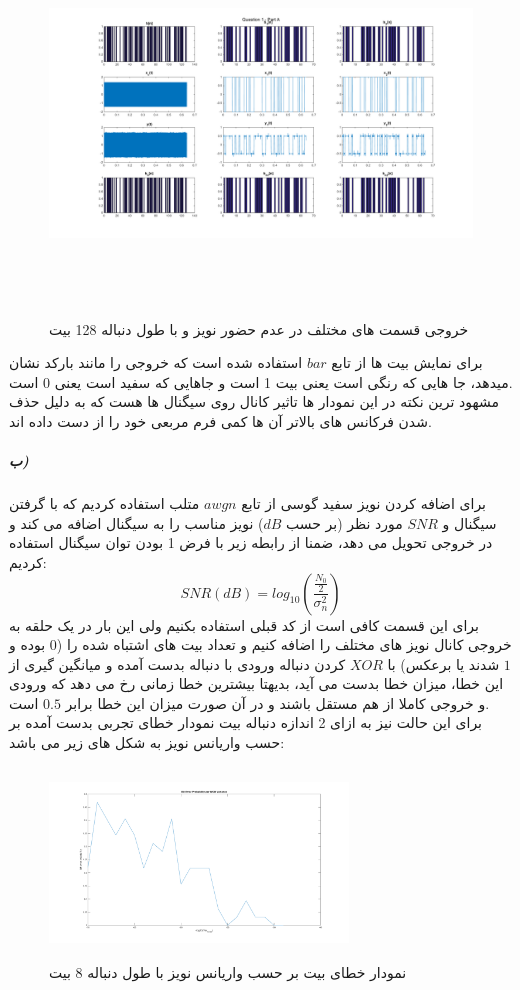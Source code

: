 \documentclass[a4paper,12pt]{article}
\begin{document}
\begin{figure}[htbp]
\centerline{\includegraphics[width=6.625in, height=4in]{../3.Transferring0and1/Q1PA_128.png}}
\caption{خروجی قسمت های مختلف در عدم حضور نویز و با طول دنباله 128 بیت}
\label{fig}
\end{figure}
برای نمایش بیت ها از تابع $bar$ استفاده شده است که خروجی را مانند بارکد نشان میدهد، جا هایی که رنگی است یعنی بیت 1 است و جاهایی که سفید است یعنی 0 است.
\\
مشهود ترین نکته در این نمودار ها تاثیر کانال روی سیگنال ها هست که به دلیل حذف شدن فرکانس های بالاتر آن ها کمی فرم مربعی خود را از دست داده اند.
\clearpage
\subparagraph{ب)}
برای اضافه کردن نویز سفید گوسی از تابع $awgn$ متلب استفاده کردیم که با گرفتن سیگنال و $SNR$ مورد نظر (بر حسب $dB$) نویز مناسب را به سیگنال اضافه می کند و در خروجی تحویل می دهد، ضمنا از رابطه زیر با فرض 1 بودن توان سیگنال استفاده کردیم:
$$
SNR(dB) = log_{10}(\frac{\frac{N_0}{2}}{\sigma_n^2})
$$
برای این قسمت کافی است از کد قبلی استفاده بکنیم ولی این بار در یک حلقه به خروجی کانال نویز های مختلف را اضافه کنیم و تعداد بیت های اشتباه شده را ($0$ بوده و $1$ شدند یا برعکس) با $XOR$ کردن دنباله ورودی با دنباله بدست آمده  و میانگین گیری از این خطا، میزان خطا بدست می آید، بدیهتا بیشترین خطا زمانی رخ می دهد که ورودی و خروجی کاملا از هم مستقل باشند و در آن صورت میزان این خطا برابر $0.5$ است.
\\
برای این حالت نیز به ازای 2 اندازه دنباله بیت نمودار خطای تجربی بدست آمده بر حسب واریانس نویز به شکل های زیر می باشد:
\begin{figure}[htbp]
\centerline{\includegraphics[width=3.125in, height=2in]{../3.Transferring0and1/Q1PB_32.png}}
\caption{نمودار خطای بیت بر حسب واریانس نویز با طول دنباله 8 بیت}
\label{fig}
\end{figure}
\end{document}
